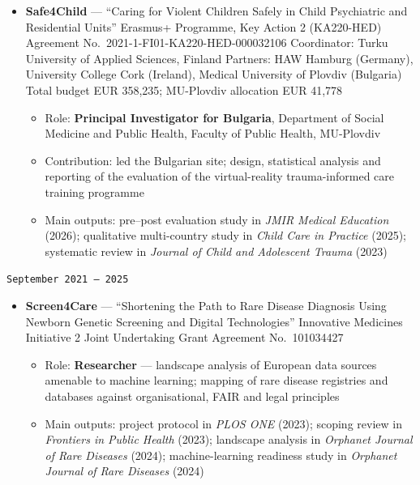 \documentclass[
  10.5pt,
  a4paper,
  DIV=11,
  numbers=noendperiod]{scrartcl}
\providecommand{\tightlist}{%
  \setlength{\itemsep}{0pt}\setlength{\parskip}{0pt}}
\let\oldtexttt\texttt
\renewcommand{\texttt}[1]{{\color{cvbronze}\small\oldtexttt{#1}}}
\begin{document}
\begin{itemize}
\tightlist
\item
  \textbf{Safe4Child} --- ``Caring for Violent Children Safely in Child
  Psychiatric and Residential Units'' \textbar{} Erasmus+ Programme, Key
  Action 2 (KA220-HED) \textbar{} Agreement
  No.~2021-1-FI01-KA220-HED-000032106 \textbar{} Coordinator: Turku
  University of Applied Sciences, Finland \textbar{} Partners: HAW
  Hamburg (Germany), University College Cork (Ireland), Medical
  University of Plovdiv (Bulgaria) \textbar{} Total budget EUR 358,235;
  MU-Plovdiv allocation EUR 41,778

  \begin{itemize}
  \tightlist
  \item
    Role: \textbf{Principal Investigator for Bulgaria}, Department of
    Social Medicine and Public Health, Faculty of Public Health,
    MU-Plovdiv
  \item
    Contribution: led the Bulgarian site; design, statistical analysis
    and reporting of the evaluation of the virtual-reality
    trauma-informed care training programme
  \item
    Main outputs: pre--post evaluation study in \emph{JMIR Medical
    Education} (2026); qualitative multi-country study in \emph{Child
    Care in Practice} (2025); systematic review in \emph{Journal of
    Child and Adolescent Trauma} (2023)
  \end{itemize}
\end{itemize}

\texttt{September\ 2021\ –\ 2025}

\begin{itemize}
\tightlist
\item
  \textbf{Screen4Care} --- ``Shortening the Path to Rare Disease
  Diagnosis Using Newborn Genetic Screening and Digital Technologies''
  \textbar{} Innovative Medicines Initiative 2 Joint Undertaking
  \textbar{} Grant Agreement No.~101034427

  \begin{itemize}
  \tightlist
  \item
    Role: \textbf{Researcher} --- landscape analysis of European data
    sources amenable to machine learning; mapping of rare disease
    registries and databases against organisational, FAIR and legal
    principles
  \item
    Main outputs: project protocol in \emph{PLOS ONE} (2023); scoping
    review in \emph{Frontiers in Public Health} (2023); landscape
    analysis in \emph{Orphanet Journal of Rare Diseases} (2024);
    machine-learning readiness study in \emph{Orphanet Journal of Rare
    Diseases} (2024)
  \end{itemize}
\end{itemize}
\end{document}
